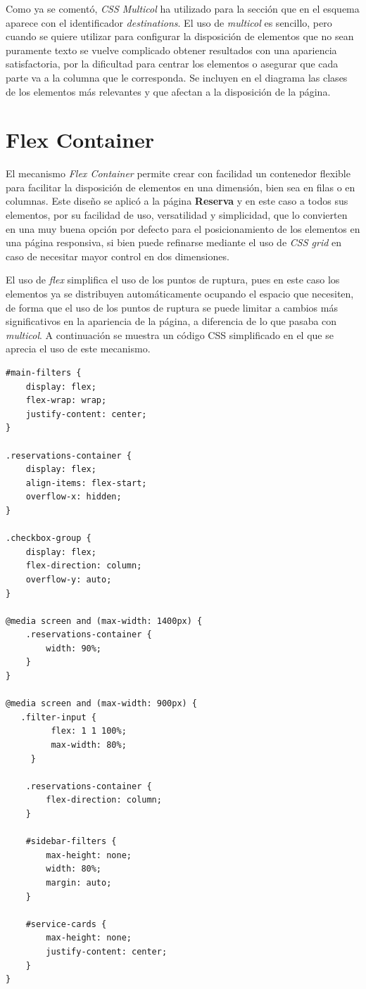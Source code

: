 \documentclass[11pt, a4paper]{book}
\begin{document}
    Como ya se comentó, \textit{CSS Multicol} ha utilizado para la sección que en el esquema aparece con el identificador \textit{destinations}. El uso de \textit{multicol} es sencillo, pero cuando se quiere utilizar para configurar la disposición de elementos que no sean puramente texto se vuelve complicado obtener resultados con una apariencia satisfactoria, por la dificultad para centrar los elementos o asegurar que cada parte va a la columna que le corresponda. Se incluyen en el diagrama las clases de los elementos más relevantes y que afectan a la disposición de la página.

	\section{Flex Container}

    El mecanismo \textit{Flex Container} permite crear con facilidad un contenedor flexible para facilitar la disposición de elementos en una dimensión, bien sea en filas o en columnas. Este diseño se aplicó a la página \textbf{Reserva} y en este caso a todos sus elementos, por su facilidad de uso, versatilidad y simplicidad, que lo convierten en una muy buena opción por defecto para el posicionamiento de los elementos en una página responsiva, si bien puede refinarse mediante el uso de \textit{CSS grid} en caso de necesitar mayor control en dos dimensiones.

    El uso de \textit{flex} simplifica el uso de los puntos de ruptura, pues en este caso los elementos ya se distribuyen automáticamente ocupando el espacio que necesiten, de forma que el uso de los puntos de ruptura se puede limitar a cambios más significativos en la apariencia de la página, a diferencia de lo que pasaba con \textit{multicol}. A continuación se muestra un código CSS simplificado en el que se aprecia el uso de este mecanismo.

	\newpage
	
	\begin{lstlisting}[]
#main-filters {
    display: flex;
    flex-wrap: wrap;
    justify-content: center;
}

.reservations-container {
    display: flex;
    align-items: flex-start;
    overflow-x: hidden;
}

.checkbox-group {
    display: flex;
    flex-direction: column;
    overflow-y: auto;
}

@media screen and (max-width: 1400px) {
    .reservations-container {
        width: 90%;
    }
}

@media screen and (max-width: 900px) {
   .filter-input {
         flex: 1 1 100%;
         max-width: 80%;
     }

    .reservations-container {
        flex-direction: column;
    }

    #sidebar-filters {
        max-height: none;
        width: 80%;
        margin: auto;
    }

    #service-cards {
        max-height: none;
        justify-content: center;
    }
}
	\end{lstlisting}
\end{document}
